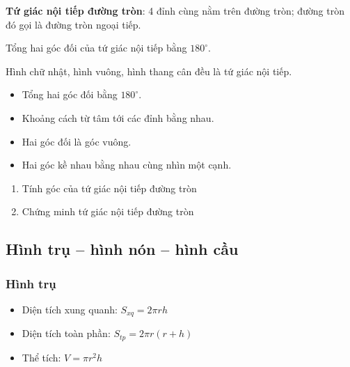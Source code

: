 \documentclass[12pt,a4paper]{article}
\begin{document}
\begin{dinhnghia}
  \textbf{Tứ giác nội tiếp đường tròn}: 4 đỉnh cùng nằm trên đường tròn; đường tròn đó gọi là đường tròn ngoại tiếp.
\end{dinhnghia}

\begin{tinhchat}
  Tổng hai góc đối của tứ giác nội tiếp bằng $180^\circ$.
\end{tinhchat}

\begin{vidu}
  Hình chữ nhật, hình vuông, hình thang cân đều là tứ giác nội tiếp.
\end{vidu}

\begin{phuongphap}[title={Chứng minh tứ giác nội tiếp}]
  \begin{itemize}
    \item Tổng hai góc đối bằng $180^\circ$.
    \item Khoảng cách từ tâm tới các đỉnh bằng nhau.
    \item Hai góc đối là góc vuông.
    \item Hai góc kề nhau bằng nhau cùng nhìn một cạnh.
  \end{itemize}
\end{phuongphap}

\begin{enumerate}[label=\textbf{Dạng \arabic*:}, leftmargin=*, align=left]
  \item Tính góc của tứ giác nội tiếp đường tròn
  \item Chứng minh tứ giác nội tiếp đường tròn
\end{enumerate}

\subsection{Hình trụ -- hình nón -- hình cầu}

\subsubsection{Hình trụ}

\begin{congthuc}
  \begin{itemize}
    \item Diện tích xung quanh: $S_{xq} = 2\pi r h$
    \item Diện tích toàn phần: $S_{tp} = 2\pi r(r + h)$
    \item Thể tích: $V = \pi r^2 h$
  \end{itemize}
\end{congthuc}
\end{document}
